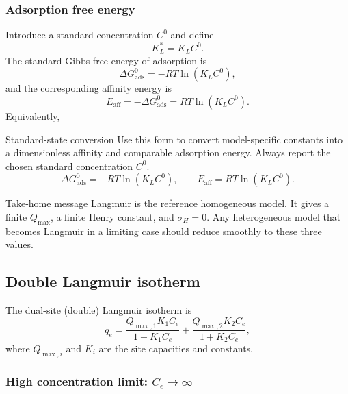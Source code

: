 \documentclass[journal=jacsat,manuscript=article]{achemso}
\begin{document}
\subsubsection{Adsorption free energy}

Introduce a standard concentration \(C^0\) and define
\begin{equation}
	K_L^{\ast} = K_L C^0.
\end{equation}
The standard Gibbs free energy of adsorption is
\begin{equation}
	\Delta G_{\mathrm{ads}}^{0}
	= - R T \ln\left( K_L C^0 \right),
\end{equation}
and the corresponding affinity energy is
\begin{equation}
	E_{\mathrm{aff}} = - \Delta G_{\mathrm{ads}}^{0}
	= R T \ln\left( K_L C^0 \right).
\end{equation}
Equivalently,
\begin{greenbox}{Standard-state conversion}
	Use this form to convert model-specific constants into a dimensionless affinity and comparable adsorption energy. Always report the chosen standard concentration \(C^0\).
\begin{equation}
	\Delta G_{\mathrm{ads}}^{0}
		= - R T \ln\left( K_L C^0 \right),
		\qquad
		E_{\mathrm{aff}} = R T \ln\left( K_L C^0 \right).
\end{equation}
\end{greenbox}

\begin{greenbox}{Take-home message}
	Langmuir is the reference homogeneous model. It gives a finite
	\(Q_{\max}\), a finite Henry constant, and \(\sigma_H=0\). Any
	heterogeneous model that becomes Langmuir in a limiting case should
	reduce smoothly to these three values.
\end{greenbox}

\subsection{Double Langmuir isotherm}
\label{sec:si_double_langmuir}

The dual-site (double) Langmuir isotherm is
\begin{equation}
	q_e
	= \frac{Q_{\max,1} K_1 C_e}{1 + K_1 C_e}
	+ \frac{Q_{\max,2} K_2 C_e}{1 + K_2 C_e},
	\label{eq:si_double_langmuir}
\end{equation}
where \(Q_{\max,i}\) and \(K_i\) are the site capacities and constants.

\subsubsection{High concentration limit: \(C_e \to \infty\)}
\end{document}
